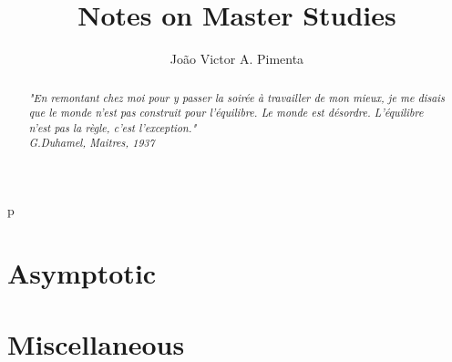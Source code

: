 \documentclass[]{report}
\title{Notes on Master Studies}
\author{João Victor A. Pimenta}
\numberwithin{equation}{section} %
\begin{document}
\maketitle

\begin{abstract}
	\textit{"En remontant chez moi pour y passer la soirée à travailler de mon mieux, je me disais que le monde n'est pas construit pour l'équilibre. Le monde est désordre. L'équilibre n'est pas la règle, c'est l'exception."\\
	G.Duhamel, Maitres, 1937}
\end{abstract}p

\chapter{Asymptotic}












\chapter{Miscellaneous}



 
\end{document}
